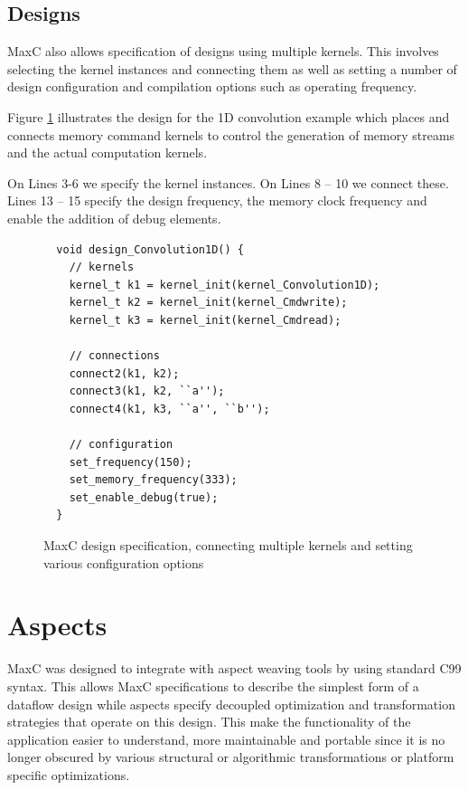 \subsection{Designs}



MaxC also allows specification of designs using multiple kernels. This
involves selecting the kernel instances and connecting them as well as
setting a number of design configuration and compilation options such
as operating frequency.

Figure \ref{lst:maxc-design} illustrates the design for the 1D
convolution example which places and connects memory command kernels
to control the generation of memory streams and the actual computation
kernels.

On Lines 3-6 we specify the kernel instances. On Lines 8 -- 10 we
connect these. Lines 13 -- 15 specify the design frequency, the memory
clock frequency and enable the addition of debug elements.

\begin{figure}[!h]
\centering
\begin{lstlisting}
  void design_Convolution1D() {
    // kernels
    kernel_t k1 = kernel_init(kernel_Convolution1D);
    kernel_t k2 = kernel_init(kernel_Cmdwrite);
    kernel_t k3 = kernel_init(kernel_Cmdread);

    // connections
    connect2(k1, k2);
    connect3(k1, k2, ``a'');
    connect4(k1, k3, ``a'', ``b'');

    // configuration
    set_frequency(150);
    set_memory_frequency(333);
    set_enable_debug(true);
  }
\end{lstlisting}
\caption{MaxC design specification, connecting multiple kernels and
  setting various configuration options}
\label{lst:maxc-design}
\end{figure}


\section{Aspects}

MaxC was designed to integrate with aspect weaving tools by using
standard C99 syntax. This allows MaxC specifications to describe the
simplest form of a dataflow design while aspects specify decoupled
optimization and transformation strategies that operate on this
design. This make the functionality of the application easier to
understand, more maintainable and portable since it is no longer
obscured by various structural or algorithmic transformations or
platform specific optimizations.

